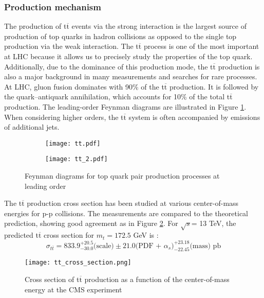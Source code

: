 \subsubsection{Production mechanism}
\noindent The production of t$\overline{\text{t}}$ events via the strong interaction is the largest source of production of top quarks in hadron collisions as opposed to the single top production via the weak interaction. The t$\overline{\text{t}}$ process is one of the most important at LHC because it allows us to precisely study the properties of the top quark. Additionally, due to the dominance of this production mode, the t$\overline{\text{t}}$ production is also a major background in many measurements and searches for rare processes.\\
\indent At LHC, gluon fusion dominates with 90\% of the t$\overline{\text{t}}$ production. It is followed by the quark–antiquark annihilation, which accounts for 10\% of the total t$\overline{\text{t}}$ production. The leading-order Feynman diagrams are illustrated in Figure \ref{fig:tt}. When considering higher orders, the t$\overline{\text{t}}$ system is often accompanied by emissions of additional jets.\\
\begin{figure}[H]
    \centering
    \begin{subfigure}[b]{0.45\textwidth}
    \centering
    \texttt{[image: tt.pdf]}
    \caption{}
  \end{subfigure}
  \begin{subfigure}[b]{0.45\textwidth}
    \centering
    \texttt{[image: tt\_2.pdf]}
    \caption{}
  \end{subfigure}
    \caption{Feynman diagrams for top quark pair production processes at leading order}
    \label{fig:tt}
\end{figure}
\indent The t$\overline{\text{t}}$ production cross section has been studied at various center-of-mass energies for p-p collisions. The measurements are compared to the theoretical prediction, showing good agreement as in Figure \ref{fig:tt_cross_section}. For $\sqrt{s} $= 13 TeV, the predicted t$\overline{\text{t}}$ cross section for $m_t = 172.5$ GeV is \cite{LHCTopWG}: 
\begin{equation}
    \sigma_{t\overline{t}} = 833.9^{+20.5}_{-30.0}\text{(scale)}\pm 21.0\text{(PDF + $\alpha_s$)}^{+23.18}_{-22.45} \text{(mass) pb}
\end{equation}
\begin{figure}[H]
    \centering
    \texttt{[image: tt\_cross\_section.png]}
    \caption{Cross section of t$\overline{\text{t}}$ production as a function of the center-of-mass energy at the CMS experiment \cite{2023_tt_X}}
    \label{fig:tt_cross_section}
\end{figure}

